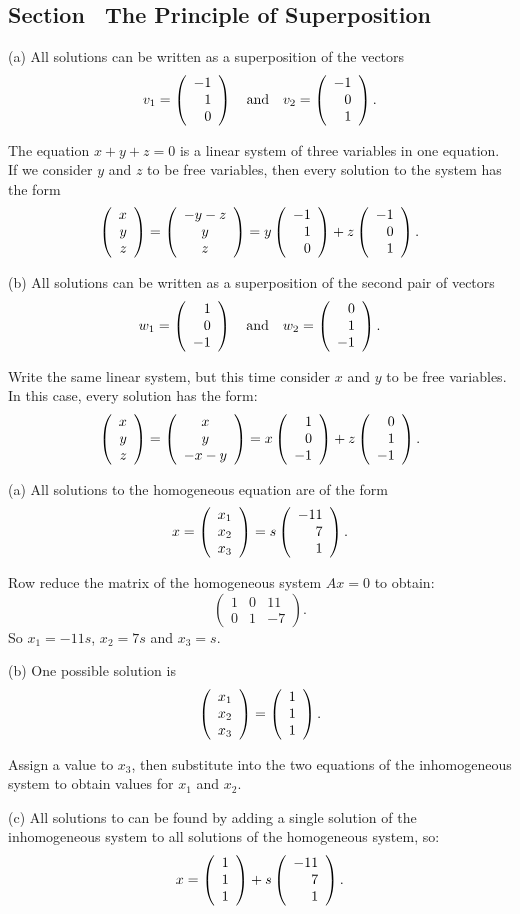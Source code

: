 \documentclass{ximera}
\begin{document}
\subsection*{Section~\protect{\ref{S:Superposition}} The Principle of
Superposition}

(a) \ans All solutions can be written as a superposition of the vectors
\[
v_1 = \left(\begin{array}{r} -1 \\ 1 \\ 0\end{array}\right) \quad\mbox{and}\quad v_2 = \left(\begin{array}{r} -1 \\ 0 \\ 1\end{array}\right).
\]

\soln The equation $x + y + z = 0$ is a linear system of three variables
in one equation.  If we consider $y$ and $z$ to be free variables, then
every solution to the system has the form
\[
\left(\begin{array}{r} x \\ y \\ z\end{array}\right) = \left(\begin{array}{c} -y - z \\ y \\
z \end{array}\right) = y\left(\begin{array}{r} -1 \\ 1 \\ 0\end{array}\right) +
z\left(\begin{array}{r} -1 \\ 0 \\ 1\end{array}\right).
\]

(b) \ans All solutions can be written as a superposition
of the second pair of vectors
\[
w_1 = \left(\begin{array}{r} 1 \\ 0 \\ -1\end{array}\right) \quad\mbox{and}\quad w_2 = \left(\begin{array}{r} 0 \\ 1 \\ -1\end{array}\right).
\]

\soln Write the same linear system, but this time consider $x$ and $y$
to be free variables.  In this case, every solution has the form:
\[
\left(\begin{array}{r} x \\ y \\ z\end{array}\right) = \left(\begin{array}{c} x \\ y \\
-x - y \end{array}\right) = x\left(\begin{array}{r} 1 \\ 0 \\ -1\end{array}\right) +
z\left(\begin{array}{r} 0 \\ 1 \\ -1\end{array}\right).
\]

(a) \ans All solutions to the homogeneous equation are of the form
\[
x = \left(\begin{array}{r} x_1 \\ x_2 \\ x_3\end{array}\right) = s\left(\begin{array}{r} -11 \\ 7 \\ 1\end{array}\right).
\]

\soln Row reduce the matrix of the homogeneous system
$Ax = 0$ to obtain:
\[
\left(\begin{array}{rrr} 1 & 0 & 11 \\ 0 & 1 & -7 \end{array}\right).
\]
So $x_1 = -11s$, $x_2 = 7s$ and $x_3 = s$.

(b) \ans One possible solution is
\[ \left(\begin{array}{r} x_1 \\ x_2 \\ x_3\end{array}\right) = \left(\begin{array}{r} 1 \\ 1 \\ 1\end{array}\right). \]

\soln Assign a value to $x_3$, then substitute into the two equations
of the inhomogeneous system to obtain values for $x_1$ and $x_2$.

(c) All solutions to  can be found by adding a
single solution of the inhomogeneous system to all solutions
of the homogeneous system, so:
\[
x = \left(\begin{array}{r} 1 \\ 1 \\ 1\end{array}\right) + s\left(\begin{array}{r} -11 \\ 7 \\ 1\end{array}\right).
\]
\end{document}
